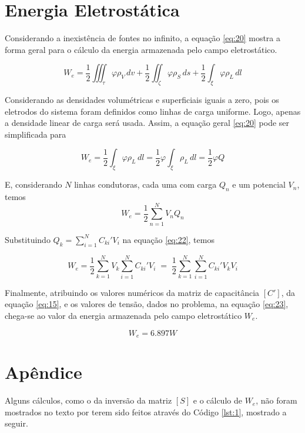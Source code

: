 \documentclass{aleph-revista}
\begin{document}
\section{Energia Eletrostática}

Considerando a inexistência de fontes no infinito, a equação \eqref{eq:20} mostra a forma geral para o cálculo da energia armazenada pelo campo eletrostático.

\begin{equation}\label{eq:20}
  W_e = \frac{1}{2}\iiint_\tau \varphi \rho_V\, dv + \frac{1}{2}\iint_\zeta \varphi \rho_S\, ds + \frac{1}{2}\int_\xi \varphi \rho_L\, dl
\end{equation}

Considerando as densidades volumétricas e superficiais iguais a zero, pois os eletrodos do sistema foram definidos como linhas de carga uniforme. Logo, apenas a densidade linear de carga será usada. Assim, a equação geral \eqref{eq:20} pode ser simplificada para

\begin{equation}\label{eq:21}
  W_e = \frac{1}{2}\int_\xi \varphi \rho_L\, dl = \frac{1}{2}\varphi \int_\xi \rho_L\, dl = \frac{1}{2}\varphi Q
\end{equation}

E, considerando $N$ linhas condutoras, cada uma com carga $Q_n$ e um potencial $V_n$, temos
\begin{equation}\label{eq:22}
  W_e = \frac{1}{2} \sum_{n=1}^N V_nQ_n
\end{equation}

Substituindo $\displaystyle Q_k=\sum_{i=1}^N C_{ki}'V_i$ na equação \eqref{eq:22}, temos

\begin{equation}\label{eq:23}
  W_e = \frac{1}{2} \sum_{k=1}^N V_k \sum_{i=1}^N C_{ki}'V_i \; = \; \frac{1}{2} \sum_{k=1}^N \sum_{i=1}^N C_{ki}'V_kV_i
\end{equation}

Finalmente, atribuindo os valores numéricos da matriz de capacitância $[C']$, da equação \eqref{eq:15}, e os valores de tensão, dados no problema, na equação \eqref{eq:23}, chega-se ao valor da energia armazenada pelo campo eletrostático $W_e$.

\begin{equation}\label{eq:24}
  W_e = 6.897 W
\end{equation}

\newpage
\section{Apêndice}
Alguns cálculos, como o da inversão da matriz $[S]$ e o cálculo de $W_e$, não foram mostrados no texto por terem sido feitos através do Código \ref{lst:1}, mostrado a seguir.
\end{document}
